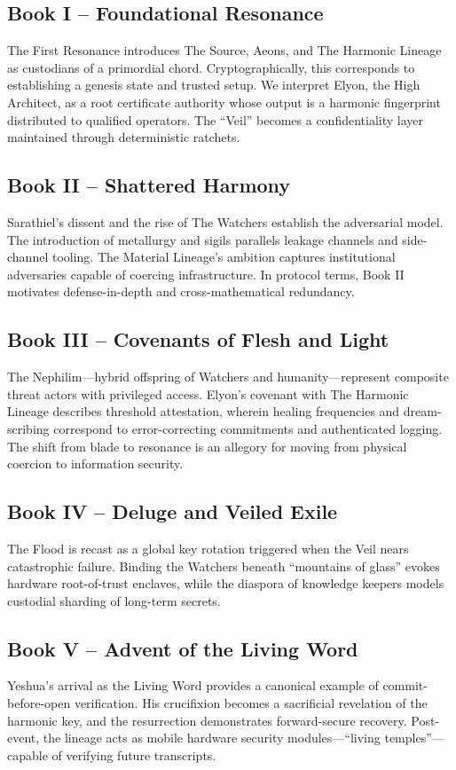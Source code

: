 \documentclass[11pt,a4paper]{article}
\begin{document}
\subsection{Book I -- Foundational Resonance}
The First Resonance introduces The Source, Aeons, and The Harmonic Lineage as custodians of a primordial chord. Cryptographically, this corresponds to establishing a genesis state and trusted setup. We interpret Elyon, the High Architect, as a root certificate authority whose output is a harmonic fingerprint distributed to qualified operators. The ``Veil'' becomes a confidentiality layer maintained through deterministic ratchets.

\subsection{Book II -- Shattered Harmony}
Sarathiel's dissent and the rise of The Watchers establish the adversarial model. The introduction of metallurgy and sigils parallels leakage channels and side-channel tooling. The Material Lineage's ambition captures institutional adversaries capable of coercing infrastructure. In protocol terms, Book II motivates defense-in-depth and cross-mathematical redundancy.

\subsection{Book III -- Covenants of Flesh and Light}
The Nephilim---hybrid offspring of Watchers and humanity---represent composite threat actors with privileged access. Elyon's covenant with The Harmonic Lineage describes threshold attestation, wherein healing frequencies and dream-scribing correspond to error-correcting commitments and authenticated logging. The shift from blade to resonance is an allegory for moving from physical coercion to information security.

\subsection{Book IV -- Deluge and Veiled Exile}
The Flood is recast as a global key rotation triggered when the Veil nears catastrophic failure. Binding the Watchers beneath ``mountains of glass'' evokes hardware root-of-trust enclaves, while the diaspora of knowledge keepers models custodial sharding of long-term secrets.

\subsection{Book V -- Advent of the Living Word}
Yeshua's arrival as the Living Word provides a canonical example of commit-before-open verification. His crucifixion becomes a sacrificial revelation of the harmonic key, and the resurrection demonstrates forward-secure recovery. Post-event, the lineage acts as mobile hardware security modules---``living temples''---capable of verifying future transcripts.
\end{document}

